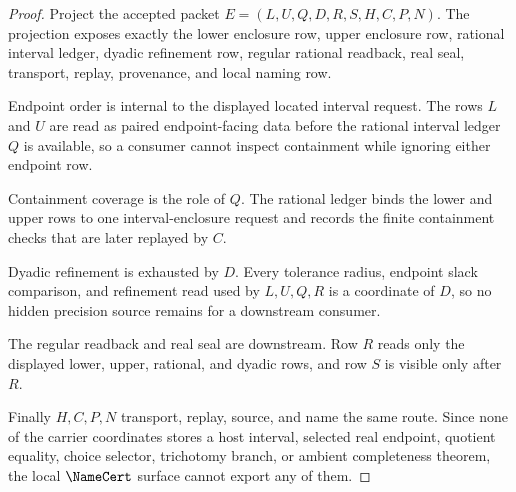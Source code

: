 \begin{proof}
Project the accepted packet $E=(L,U,Q,D,R,S,H,C,P,N)$. The projection exposes exactly the lower enclosure row, upper enclosure row, rational interval ledger, dyadic refinement row, regular rational readback, real seal, transport, replay, provenance, and local naming row.

Endpoint order is internal to the displayed located interval request. The rows $L$ and $U$ are read as paired endpoint-facing data before the rational interval ledger $Q$ is available, so a consumer cannot inspect containment while ignoring either endpoint row.

Containment coverage is the role of $Q$. The rational ledger binds the lower and upper rows to one interval-enclosure request and records the finite containment checks that are later replayed by $C$.

Dyadic refinement is exhausted by $D$. Every tolerance radius, endpoint slack comparison, and refinement read used by $L,U,Q,R$ is a coordinate of $D$, so no hidden precision source remains for a downstream consumer.

The regular readback and real seal are downstream. Row $R$ reads only the displayed lower, upper, rational, and dyadic rows, and row $S$ is visible only after $R$.

Finally $H,C,P,N$ transport, replay, source, and name the same route. Since none of the carrier coordinates stores a host interval, selected real endpoint, quotient equality, choice selector, trichotomy branch, or ambient completeness theorem, the local $\NameCert$ surface cannot export any of them.
\end{proof}


